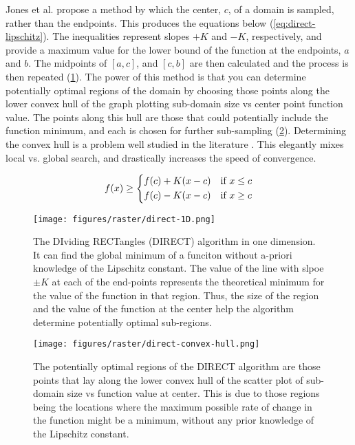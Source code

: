 Jones et al. \cite{jonesLipschitzianOptimizationLipschitz1993} propose a method by which the center, $c$, of a domain is sampled, rather than the endpoints. This produces the equations below (\cref{eq:direct-lipschitz}). The inequalities represent slopes $+K$ and $-K$, respectively, and provide a maximum value for the lower bound of the function at the endpoints, $a$ and $b$. The midpoints of $[a,c]$, and $[c,b]$ are then calculated and the process is then repeated (\cref{fig:direct-1D}). The power of this method is that you can determine potentially optimal regions of the domain by choosing those points along the lower convex hull of the graph plotting sub-domain size vs center point function value. The points along this hull are those that could potentially include the function minimum, and each is chosen for further sub-sampling (\cref{fig:direct-convex-hull}). Determining the convex hull is a problem well studied in the literature \cite{barberQuickhullAlgorithmConvex1996,chanOptimalOutputsensitiveConvex1996,jarvisIdentificationConvexHull1973,grahamEfficientAlgorithDetermining1972}. This elegantly mixes local vs. global search, and drastically increases the speed of convergence.


\begin{equation}
    f(x) \ge \begin{dcases}
        f(c) + K(x-c) & \text{if  } x \le c \\
        f(c) - K(x-c) & \text{if  } x \ge c
    \end{dcases}
    \label{eq:direct-lipschitz}
\end{equation}

\begin{figure}[h!]
    \begin{center}
        \texttt{[image: figures/raster/direct-1D.png]}
    \end{center}
    \caption{The DIviding RECTangles (DIRECT) algorithm in one dimension. It can find the global minimum of a funciton without a-priori knowledge of the Lipschitz constant. The value of the line with slpoe $\pm K$ at each of the end-points represents the theoretical minimum for the value of the function in that region. Thus, the size of the region and the value of the function at the center help the algorithm determine potentially optimal sub-regions.}
    \label{fig:direct-1D}
\end{figure}

\begin{figure}[h!]
    \begin{center}
      \texttt{[image: figures/raster/direct-convex-hull.png]}
    \end{center}
    \caption{The potentially optimal regions of the DIRECT algorithm are those points that lay along the lower convex hull of the scatter plot of sub-domain size vs function value at center. This is due to those regions being the locations where the maximum possible rate of change in the function might be a minimum, without any prior knowledge of the Lipschitz constant.}
    \label{fig:direct-convex-hull}
\end{figure}

